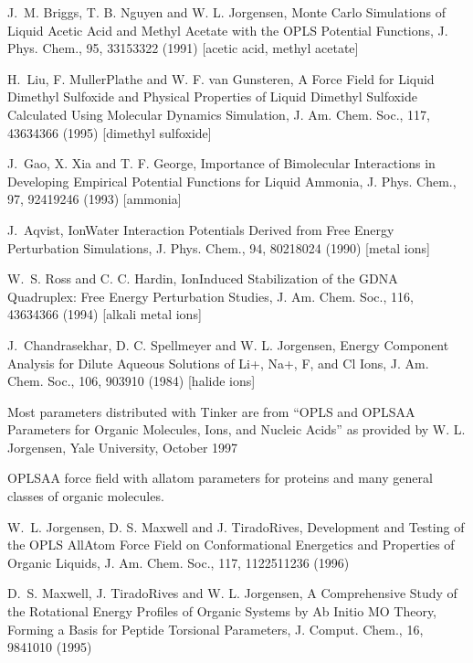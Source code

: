 \documentclass[letterpaper,11pt,english]{sphinxmanual}
\begin{document}
J. M. Briggs, T. B. Nguyen and W. L. Jorgensen, Monte Carlo Simulations of Liquid Acetic Acid and Methyl Acetate with the OPLS Potential Functions, J. Phys. Chem., 95, 3315\sphinxhyphen{}3322 (1991)  {[}acetic acid, methyl acetate{]}

H. Liu, F. Muller\sphinxhyphen{}Plathe and W. F. van Gunsteren, A Force Field for Liquid Dimethyl Sulfoxide and Physical Properties of Liquid Dimethyl Sulfoxide Calculated Using Molecular Dynamics Simulation, J. Am. Chem. Soc., 117, 4363\sphinxhyphen{}4366 (1995)  {[}dimethyl sulfoxide{]}

J. Gao, X. Xia and T. F. George, Importance of Bimolecular Interactions in Developing Empirical Potential Functions for Liquid Ammonia, J. Phys. Chem., 97, 9241\sphinxhyphen{}9246 (1993)  {[}ammonia{]}

J. Aqvist, Ion\sphinxhyphen{}Water Interaction Potentials Derived from Free Energy Perturbation Simulations, J. Phys. Chem., 94, 8021\sphinxhyphen{}8024 (1990)  {[}metal ions{]}

W. S. Ross and C. C. Hardin, Ion\sphinxhyphen{}Induced Stabilization of the G\sphinxhyphen{}DNA Quadruplex: Free Energy Perturbation Studies, J. Am. Chem. Soc., 116, 4363\sphinxhyphen{}4366 (1994)  {[}alkali metal ions{]}

J. Chandrasekhar, D. C. Spellmeyer and W. L. Jorgensen, Energy Component Analysis for Dilute Aqueous Solutions of Li+, Na+, F\sphinxhyphen{}, and Cl\sphinxhyphen{} Ions, J. Am. Chem. Soc., 106, 903\sphinxhyphen{}910 (1984)  {[}halide ions{]}

Most parameters distributed with Tinker are from “OPLS and OPLS\sphinxhyphen{}AA Parameters for Organic Molecules, Ions, and Nucleic Acids” as provided by W. L. Jorgensen, Yale University, October 1997


OPLS\sphinxhyphen{}AA force field with all\sphinxhyphen{}atom parameters for proteins and many general classes of organic molecules.

W. L. Jorgensen, D. S. Maxwell and J. Tirado\sphinxhyphen{}Rives, Development and Testing of the OPLS All\sphinxhyphen{}Atom Force Field on Conformational Energetics and Properties of Organic Liquids, J. Am. Chem. Soc., 117, 11225\sphinxhyphen{}11236 (1996)

D. S. Maxwell, J. Tirado\sphinxhyphen{}Rives and W. L. Jorgensen, A Comprehensive Study of the Rotational Energy Profiles of Organic Systems by Ab Initio MO Theory, Forming a Basis for Peptide Torsional Parameters, J. Comput. Chem., 16, 984\sphinxhyphen{}1010 (1995)
\end{document}
